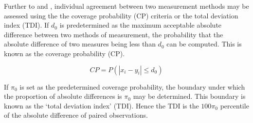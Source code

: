 \documentclass[Chap3bmain.tex]{subfiles}
\begin{document}
Further to  \citet{lin2000} and \citet{lin2002}, individual agreement between two measurement methods may be
assessed using the the coverage probability (CP) criteria or the total deviation index (TDI). If $d_{0}$ is predetermined as the maximum acceptable absolute difference between two methods of measurement, the probability that the absolute difference of two measures being less than $d_{0}$ can be computed. This is known as the coverage probability (CP).

\begin{equation}
CP = P(|x_{i} - y_{i}| \leq d_{0})
\end{equation}

If $\pi_{0}$ is set as the predetermined coverage probability, the
boundary under which the proportion of absolute differences is
$\pi_{0}$ may be determined. This boundary is known as the `total
deviation index' (TDI). Hence the TDI is the $100\pi_{0}$
percentile of the absolute difference of paired observations.
\end{document}
